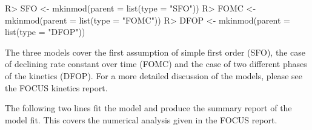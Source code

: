 \documentclass[12pt,a4paper]{article}
\begin{document}
\begin{Schunk}
\begin{Sinput}
R> SFO <- mkinmod(parent = list(type = "SFO"))
R> FOMC <- mkinmod(parent = list(type = "FOMC"))
R> DFOP <- mkinmod(parent = list(type = "DFOP"))
\end{Sinput}
\end{Schunk}

The three models cover the first assumption of simple first order (SFO),
the case of declining rate constant over time (FOMC) and the case of two
different phases of the kinetics (DFOP). For a more detailed discussion
of the models, please see the FOCUS kinetics report.

The following two lines fit the model and produce the summary report
of the model fit. This covers the numerical analysis given in the 
FOCUS report.
\end{document}
